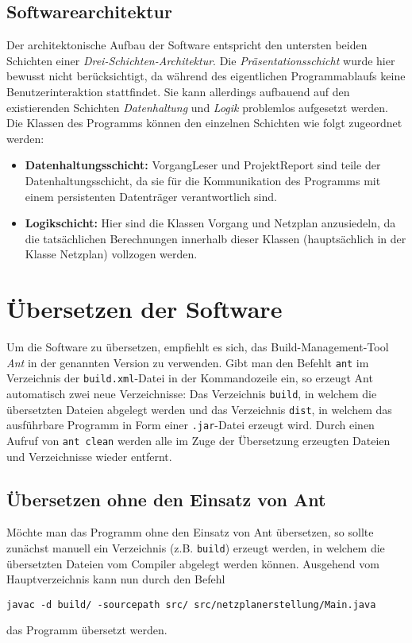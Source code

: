 \subsection{Softwarearchitektur}

Der architektonische Aufbau der Software entspricht den
untersten beiden Schichten einer
\textit{Drei-Schichten-Architektur}. Die
\textit{Pr\"asentationsschicht} wurde
hier bewusst nicht ber\"ucksichtigt, da w\"ahrend des eigentlichen
Programmablaufs keine Benutzerinteraktion stattfindet. Sie kann
allerdings aufbauend auf den existierenden Schichten
\textit{Datenhaltung} und \textit{Logik} problemlos aufgesetzt werden.
Die Klassen des Programms k\"onnen den einzelnen Schichten wie folgt
zugeordnet werden:
\begin{itemize}
  \item \textbf{Datenhaltungsschicht:} VorgangLeser und ProjektReport
    sind teile der Datenhaltungsschicht, da sie f\"ur die
    Kommunikation des Programms mit einem persistenten Datentr\"ager
    verantwortlich sind.
  \item \textbf{Logikschicht:} Hier sind die Klassen Vorgang und
    Netzplan anzusiedeln, da die tats\"achlichen Berechnungen
    innerhalb dieser Klassen (haupts\"achlich in der Klasse Netzplan)
    vollzogen werden.
\end{itemize}

\section{\"Ubersetzen der Software}

Um die Software zu \"ubersetzen, empfiehlt es sich, das
Build-Management-Tool \textit{Ant} in der genannten Version zu
verwenden. Gibt man den Befehlt \texttt{ant} im Verzeichnis der
\texttt{build.xml}-Datei in der Kommandozeile ein, so erzeugt Ant
automatisch zwei neue Verzeichnisse: Das Verzeichnis \texttt{build},
in welchem die \"ubersetzten Dateien abgelegt werden und das
Verzeichnis \texttt{dist}, in welchem das ausf\"uhrbare Programm in
Form einer \texttt{.jar}-Datei erzeugt wird.
Durch einen Aufruf von \texttt{ant clean} werden alle im Zuge der
\"Ubersetzung erzeugten Dateien und Verzeichnisse wieder entfernt.

\subsection{\"Ubersetzen ohne den Einsatz von Ant}

M\"ochte man das Programm ohne den Einsatz von Ant \"ubersetzen, so
sollte zun\"achst manuell ein Verzeichnis (z.B. \texttt{build})
erzeugt werden, in welchem die \"ubersetzten Dateien vom Compiler
abgelegt werden k\"onnen. Ausgehend vom Hauptverzeichnis kann nun
durch den Befehl
\begin{verbatim}
javac -d build/ -sourcepath src/ src/netzplanerstellung/Main.java
\end{verbatim}
das Programm \"ubersetzt werden.

